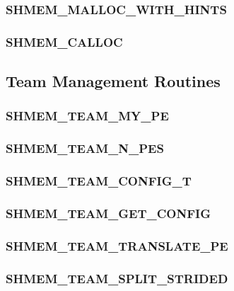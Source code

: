 \documentclass[10pt]{book}
\begin{document}
\subsubsection{\textbf{SHMEM\_MALLOC\_WITH\_HINTS}}\label{subsec:shmmallochint}


\subsubsection{\textbf{SHMEM\_CALLOC}}\label{subsec:shmem_calloc}




\subsection{Team Management Routines}\label{subsec:team}


\subsubsection{\textbf{SHMEM\_TEAM\_MY\_PE}}\label{subsec:shmem_team_my_pe}


\subsubsection{\textbf{SHMEM\_TEAM\_N\_PES}}\label{subsec:shmem_team_n_pes}


\subsubsection{\textbf{SHMEM\_TEAM\_CONFIG\_T}}
\label{subsec:shmem_team_config_t}


\subsubsection{\textbf{SHMEM\_TEAM\_GET\_CONFIG}}\label{subsec:shmem_team_get_config}


\subsubsection{\textbf{SHMEM\_TEAM\_TRANSLATE\_PE}}\label{subsec:shmem_team_translate_pe}


\subsubsection{\textbf{SHMEM\_TEAM\_SPLIT\_STRIDED}}\label{subsec:shmem_team_split_strided}

\end{document}
